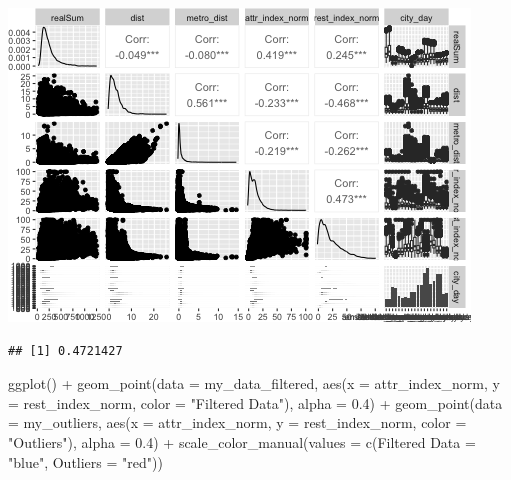 \documentclass[
]{article}
\newenvironment{Shaded}{\begin{snugshade}}{\end{snugshade}}
\newcommand{\AttributeTok}[1]{\textcolor[rgb]{0.77,0.63,0.00}{#1}}
\newcommand{\FloatTok}[1]{\textcolor[rgb]{0.00,0.00,0.81}{#1}}
\newcommand{\FunctionTok}[1]{\textcolor[rgb]{0.00,0.00,0.00}{#1}}
\newcommand{\NormalTok}[1]{#1}
\newcommand{\OtherTok}[1]{\textcolor[rgb]{0.56,0.35,0.01}{#1}}
\newcommand{\SpecialCharTok}[1]{\textcolor[rgb]{0.00,0.00,0.00}{#1}}
\newcommand{\StringTok}[1]{\textcolor[rgb]{0.31,0.60,0.02}{#1}}
\begin{document}
\includegraphics{Project_files/figure-latex/unnamed-chunk-34-1.png}

\begin{Shaded}
\end{Shaded}

\begin{verbatim}
## [1] 0.4721427
\end{verbatim}

\begin{Shaded}
\begin{Highlighting}[]
\FunctionTok{ggplot}\NormalTok{() }\SpecialCharTok{+} \FunctionTok{geom\_point}\NormalTok{(}\AttributeTok{data =}\NormalTok{ my\_data\_filtered, }\FunctionTok{aes}\NormalTok{(}\AttributeTok{x =}\NormalTok{ attr\_index\_norm,}
    \AttributeTok{y =}\NormalTok{ rest\_index\_norm, }\AttributeTok{color =} \StringTok{"Filtered Data"}\NormalTok{), }\AttributeTok{alpha =} \FloatTok{0.4}\NormalTok{) }\SpecialCharTok{+}
    \FunctionTok{geom\_point}\NormalTok{(}\AttributeTok{data =}\NormalTok{ my\_outliers, }\FunctionTok{aes}\NormalTok{(}\AttributeTok{x =}\NormalTok{ attr\_index\_norm, }\AttributeTok{y =}\NormalTok{ rest\_index\_norm,}
        \AttributeTok{color =} \StringTok{"Outliers"}\NormalTok{), }\AttributeTok{alpha =} \FloatTok{0.4}\NormalTok{) }\SpecialCharTok{+} \FunctionTok{scale\_color\_manual}\NormalTok{(}\AttributeTok{values =} \FunctionTok{c}\NormalTok{(}\StringTok{\textasciigrave{}}\AttributeTok{Filtered Data}\StringTok{\textasciigrave{}} \OtherTok{=} \StringTok{"blue"}\NormalTok{,}
    \AttributeTok{Outliers =} \StringTok{"red"}\NormalTok{))}
\end{Highlighting}
\end{Shaded}
\end{document}
